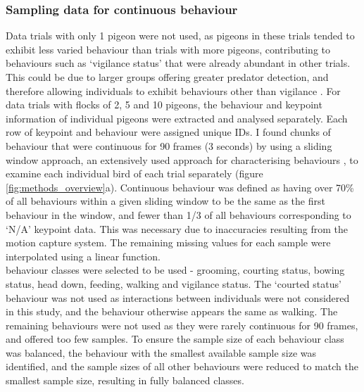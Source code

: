 \documentclass[11pt, letterpaper]{article} %
\begin{document}
        \subsubsection{Sampling data for continuous behaviour}
        Data trials with only 1 pigeon were not used, as pigeons in these trials tended to exhibit less varied behaviour than trials with more pigeons, contributing to behaviours such as `vigilance status' that were already abundant in other trials. This could be due to larger groups offering greater predator detection, and therefore allowing individuals to exhibit behaviours other than vigilance \citep{beauchamp_what_2008}.
        For data trials with flocks of 2, 5 and 10 pigeons, the behaviour and keypoint information of individual pigeons were extracted and analysed separately. Each row of keypoint and behaviour were assigned unique IDs.
        I found chunks of behaviour that were continuous for 90 frames (3 seconds) by using a sliding window approach, an extensively used approach for characterising behaviours \citep{banos_window_2014,fly_timeseries_2019}, to examine each individual bird of each trial separately (figure \ref{fig:methods_overview}a). Continuous behaviour was defined as having over 70\% of all behaviours within a given sliding window to be the same as the first behaviour in the window, and fewer than 1/3 of all behaviours corresponding to `N/A' keypoint data. This was necessary due to inaccuracies resulting from the motion capture system. The remaining missing values for each sample were interpolated using a linear function. \\
        
         behaviour classes were selected to be used - grooming, courting status, bowing status, head down, feeding, walking and vigilance status. The `courted status' behaviour was not used as interactions between individuals were not considered in this study, and the behaviour otherwise appears the same as walking. The remaining behaviours were not used as they were rarely continuous for 90 frames, and offered too few samples.
        To ensure the sample size of each behaviour class was balanced, the behaviour with the smallest available sample size was identified, and the sample sizes of all other behaviours were reduced to match the smallest sample size, resulting in fully balanced classes.
\end{document}
